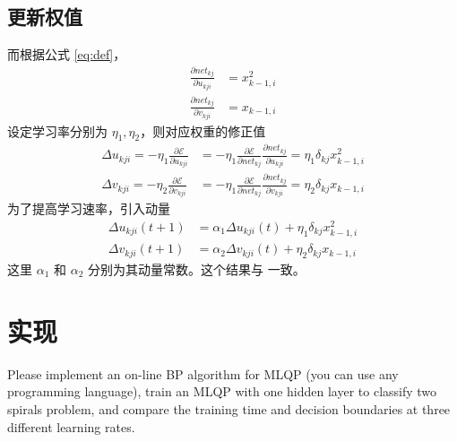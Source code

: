     \subsection{更新权值}
    而根据公式 \eqref{eq:def}，
    \begin{align*}
        \frac{\partial\mathit{net}_{kj}}{\partial u_{kji}} &= x_{k-1,i}^2 \\
        \frac{\partial\mathit{net}_{kj}}{\partial v_{kji}} &= x_{k-1,i}
    \end{align*}
    设定学习率分别为 $\eta_1,\eta_2$，则对应权重的修正值
    \begin{align*}
        \Delta u_{kji} = -\eta_1\frac{\partial\mathcal{E}}{\partial u_{kji}} 
        &=-\eta_1\frac{\partial\mathcal{E}}{\partial\mathit{net}_{kj}}\frac{\partial\mathit{net}_{kj}}{\partial u_{kji}}=\eta_1\delta_{kj}x_{k-1,i}^2 \\
        \Delta v_{kji} = -\eta_2\frac{\partial\mathcal{E}}{\partial v_{kji}} &=-\eta_1\frac{\partial\mathcal{E}}{\partial\mathit{net}_{kj}}\frac{\partial\mathit{net}_{kj}}{\partial v_{kji}}= \eta_2\delta_{kj}x_{k-1,i}
    \end{align*}
    为了提高学习速率，引入动量
    \begin{align}
        \Delta u_{kji}(t+1) &= \alpha_1\Delta u_{kji}(t) + \eta_1\delta_{kj}x_{k-1,i}^2 \\
        \Delta v_{kji}(t+1) &= \alpha_2\Delta v_{kji}(t) + \eta_2\delta_{kj}x_{k-1,i} 
    \end{align}
    这里 $\alpha_1$ 和 $\alpha_2$ 分别为其动量常数。这个结果与 \cite{MLQP} 一致。

    \section{实现}
    \begin{problem}
        Please implement an on-line BP algorithm for MLQP
(you can use any programming language), train an MLQP
with one hidden layer to classify two spirals problem,
and compare the training time and decision boundaries at
three different learning rates.
    \end{problem}

    
